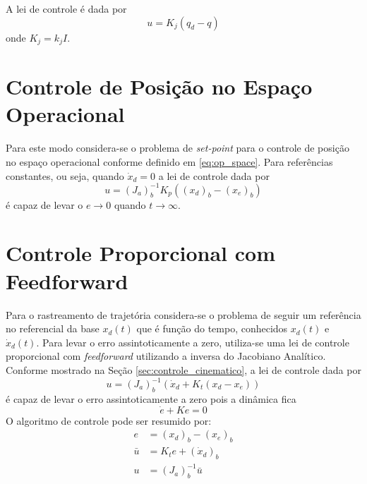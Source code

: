 A lei de controle é dada por 
\begin{equation}
{u} = {K}_j ({q}_d - {q})
\end{equation}
onde ${K_j} = k_j {I}$.

\section{Controle de Posição no Espaço Operacional} \label{sec:pos_operacional}
Para este modo considera-se o problema de \textit{set-point} para o controle de posição no espaço operacional conforme definido em \ref{eq:op_space}. Para referências constantes, ou seja, quando $\dot{{x}}_d = 0$ a lei de controle dada por
\begin{equation} \label{eq:lei_posicao}
{u} = ({J}_{a})_b^{-1} {K}_p ( ({x_d})_b - ({x_e})_b)
\end{equation}
é capaz de levar o ${e} \rightarrow 0$ quando $t \rightarrow \infty$.

\section{Controle Proporcional com Feedforward} \label{sec:pplusf}
Para o rastreamento de trajetória considera-se o problema de seguir um referência no referencial da base ${x}_d(t)$ que é função do tempo, conhecidos ${x}_d(t)$ e ${\dot{x}}_d(t)$. Para levar o erro assintoticamente a zero, utiliza-se uma lei de controle proporcional com \textit{feedforward} utilizando a inversa do Jacobiano Analítico. Conforme mostrado na Seção \ref{sec:controle_cinematico}, a lei de controle dada por 
\begin{equation}
{u} = ({J}_{a})_b^{-1} (\dot{{x}}_d + {K}_t ({x_d} - {x_e}))
\end{equation} 
é capaz de levar o erro assintoticamente a zero pois a dinâmica fica 
\begin{equation}
\dot{{e}} + {K} {e} = 0
\end{equation}
O algoritmo de controle pode ser resumido por:
\begin{align}
{e} &= ({x}_d)_b- ({x_e})_b  \label{eq:error_pf}\\
{\bar{u}} &= {K}_t {e} + ({\dot{x}}_d)_b \\
{u} &= ({J}_a)_b^{-1} {\bar{u}}
\end{align}


